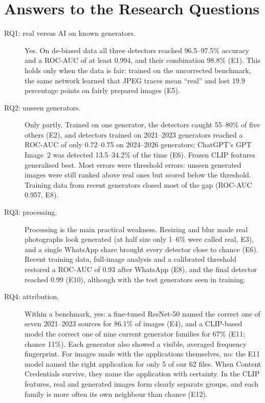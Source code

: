 \documentclass{mnnit}
\begin{document}
\section{Answers to the Research Questions}
\begin{description}
  \item[RQ1: real versus AI on known generators.] Yes. On de-biased data
        all three detectors reached 96.5--97.5\% accuracy and a \mbox{ROC-AUC}
        of at least 0.994, and their combination 98.8\% (E1). This holds
        only when the data is fair: trained on the uncorrected benchmark,
        the same network learned that JPEG traces mean ``real'' and lost
        19.9 percentage points on fairly prepared images (E5).
  \item[RQ2: unseen generators.] Only partly. Trained on one generator,
        the detectors caught 55--80\% of five others (E2), and detectors
        trained on 2021--2023 generators reached a \mbox{ROC-AUC} of only
        0.72--0.75 on 2024--2026 generators; ChatGPT's GPT Image~2 was
        detected 13.5--34.2\% of the time (E6). Frozen CLIP features
        generalised best. Most errors were threshold errors: unseen
        generated images were still ranked above real ones but scored
        below the threshold. Training data from recent generators closed
        most of the gap (\mbox{ROC-AUC} 0.957, E8).
  \item[RQ3: processing.] Processing is the main practical weakness.
        Resizing and blur made real photographs look generated (at half
        size only 1--6\% were called real, E3), and a single WhatsApp
        share brought every detector close to chance (E6). Recent
        training data, full-image analysis and a calibrated threshold
        restored a \mbox{ROC-AUC} of 0.93 after WhatsApp (E8), and the final
        detector reached 0.99 (E10), although with the test generators
        seen in training.
  \item[RQ4: attribution.] Within a benchmark, yes: a fine-tuned
        \mbox{ResNet-50} named the correct one of seven 2021--2023 sources for
        86.1\% of images (E4), and a CLIP-based model the correct one of
        nine current generator families for 67\% (E11; chance 11\%).
        Each generator also showed a visible, averaged frequency
        fingerprint. For images made with the applications themselves,
        no: the E11 model named the right application for only 5 of our
        62 files. When Content Credentials survive, they name the
        application with certainty. In the CLIP features, real and
        generated images form clearly separate groups, and each family
        is more often its own neighbour than chance (E12).
\end{description}
\end{document}
